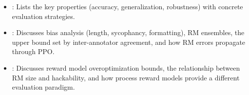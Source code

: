 \begin{interviewq}
\goodgreat
\begin{itemize}
\item {}: Lists the key properties (accuracy, generalization,
  robustness) with concrete evaluation strategies.
\item {}: Discusses bias analysis (length, sycophancy,
  formatting), RM ensembles, the upper bound set by inter-annotator
  agreement, and how RM errors propagate through PPO.
\item {}: Discusses reward model overoptimization bounds,
  the relationship between RM size and hackability, and how process
  reward models provide a different evaluation paradigm.
\end{itemize}

\end{interviewq}

